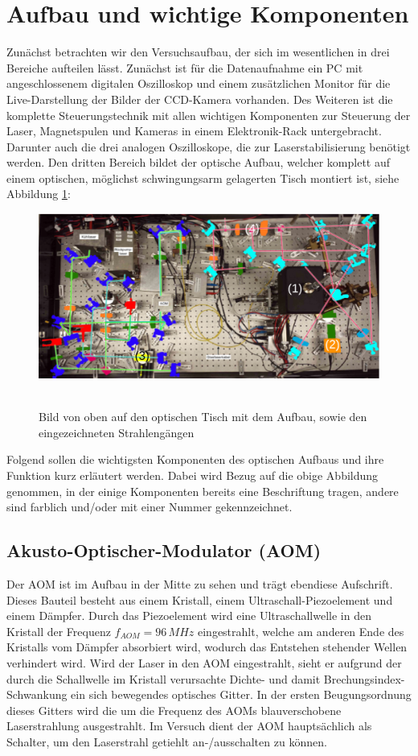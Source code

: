 \documentclass[twoside,colorback,accentcolor=tud4c,11pt]{tudreport}
\begin{document}
\section{Aufbau und wichtige Komponenten}
Zunächst betrachten wir den Versuchsaufbau, der sich im wesentlichen in drei Bereiche aufteilen lässt. Zunächst ist für die Datenaufnahme ein PC mit angeschlossenem digitalen Oszilloskop und einem zusätzlichen Monitor für die Live-Darstellung der Bilder der CCD-Kamera vorhanden. Des Weiteren ist die komplette Steuerungstechnik mit allen wichtigen Komponenten zur Steuerung der Laser, Magnetspulen und Kameras in einem Elektronik-Rack untergebracht. Darunter auch die drei analogen Oszilloskope, die zur Laserstabilisierung benötigt werden. Den dritten Bereich bildet der optische Aufbau, welcher komplett auf einem optischen, möglichst schwingungsarm gelagerten Tisch montiert ist, siehe Abbildung \ref{aufb}:
\begin{figure}[H]
\centering
   	\begin{minipage}[b]{0.85\textwidth}
   	\includegraphics[width=\textwidth]{graphics/aufbau2.png}\
   	\end{minipage}
\caption{Bild von oben auf den optischen Tisch mit dem Aufbau, sowie den eingezeichneten Strahlengängen \cite{anl}}\label{aufb}	
\end{figure}
Folgend sollen die wichtigsten Komponenten des optischen Aufbaus und ihre Funktion kurz erläutert werden. Dabei wird Bezug auf die obige Abbildung genommen, in der einige Komponenten bereits eine Beschriftung tragen, andere sind farblich und/oder mit einer Nummer gekennzeichnet.
\subsection{Akusto-Optischer-Modulator (AOM)}
Der AOM ist im Aufbau in der Mitte zu sehen und trägt ebendiese Aufschrift. Dieses Bauteil besteht aus einem Kristall, einem Ultraschall-Piezoelement und einem Dämpfer. Durch das Piezoelement wird eine Ultraschallwelle in den Kristall der Frequenz $f_{AOM}=96\,\si{MHz}$ eingestrahlt, welche am anderen Ende des Kristalls vom Dämpfer absorbiert wird, wodurch das Entstehen stehender Wellen verhindert wird. Wird der Laser in den AOM eingestrahlt, sieht er aufgrund der durch die Schallwelle im Kristall verursachte Dichte- und damit Brechungsindex-Schwankung ein sich bewegendes optisches Gitter. In der ersten Beugungsordnung dieses Gitters wird die um die Frequenz des AOMs blauverschobene Laserstrahlung ausgestrahlt. Im Versuch dient der AOM hauptsächlich als Schalter, um den Laserstrahl getiehlt an-/ausschalten zu können.
\end{document}
